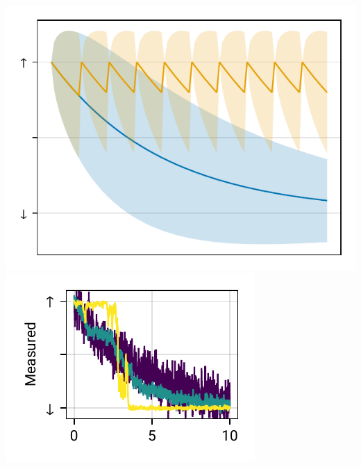\documentclass[
]{beamer}
\begin{document}
\begin{frame}{}
	\begin{columns}
		\includegraphics[width=\textwidth]{figures/04 discreate zeno.pdf}
		\includegraphics[width=\textwidth]{figures/06 sme small.pdf}
		

\end{columns}
\end{frame}
\end{document}
